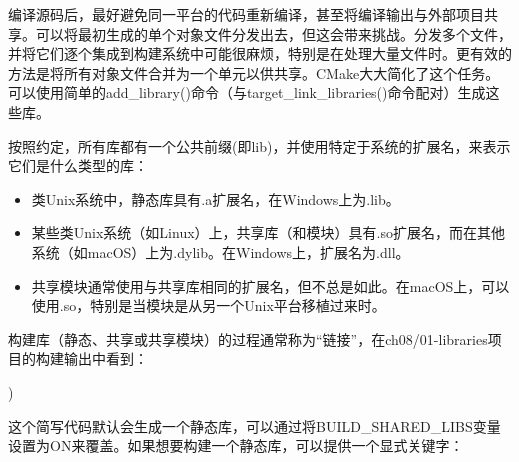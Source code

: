 
编译源码后，最好避免同一平台的代码重新编译，甚至将编译输出与外部项目共享。可以将最初生成的单个对象文件分发出去，但这会带来挑战。分发多个文件，并将它们逐个集成到构建系统中可能很麻烦，特别是在处理大量文件时。更有效的方法是将所有对象文件合并为一个单元以供共享。CMake大大简化了这个任务。可以使用简单的add\_library()命令（与target\_link\_libraries()命令配对）生成这些库。

按照约定，所有库都有一个公共前缀(即lib)，并使用特定于系统的扩展名，来表示它们是什么类型的库：

\begin{itemize}
\item
类Unix系统中，静态库具有.a扩展名，在Windows上为.lib。

\item
某些类Unix系统（如Linux）上，共享库（和模块）具有.so扩展名，而在其他系统（如macOS）上为.dylib。在Windows上，扩展名为.dll。

\item
共享模块通常使用与共享库相同的扩展名，但不总是如此。在macOS上，可以使用.so，特别是当模块是从另一个Unix平台移植过来时。
\end{itemize}

构建库（静态、共享或共享模块）的过程通常称为“链接”，在ch08/01-libraries项目的构建输出中看到：

)
\end{shell}

这个简写代码默认会生成一个静态库，可以通过将BUILD\_SHARED\_LIBS变量设置为ON来覆盖。如果想要构建一个静态库，可以提供一个显式关键字：

